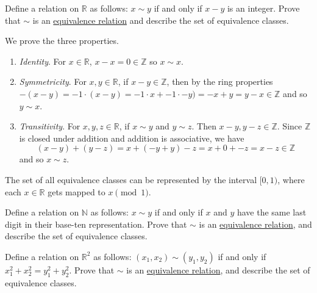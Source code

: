   \begin{exercise}
    Define a relation on $\mathbb{R}$ as follows: $x \sim y$ if and only if $x - y$ is an integer. Prove that $\sim$ is an \hyperref[def:equivalence_relation]{equivalence relation} and describe the set of equivalence classes.
  \end{exercise}
  \begin{solution}
    We prove the three properties. 
    \begin{enumerate}
      \item \textit{Identity}. For $x \in \mathbb{R}$, $x - x = 0 \in \mathbb{Z}$ so $x \sim x$. 
      \item \textit{Symmetricity}. For $x, y \in \mathbb{R}$, if $x - y \in \mathbb{Z}$, then by the ring properties $-(x - y) = -1 \cdot (x - y) = -1 \cdot x + -1 \cdot -y) = -x + y = y - x \in \mathbb{Z}$ and so $y \sim x$. 
      \item \textit{Transitivity}. For $x, y, z \in \mathbb{R}$, if $x \sim y$ and $y \sim z$. Then $x - y, y - z \in \mathbb{Z}$. Since $\mathbb{Z}$ is closed under addition and addition is associative, we have 
        \begin{equation}
          (x - y) + (y - z) = x + (-y + y) - z = x + 0 + -z = x - z \in \mathbb{Z}
        \end{equation}
        and so $x \sim z$. 
    \end{enumerate}
    The set of all equivalence classes can be represented by the interval $[0, 1)$, where each $x \in \mathbb{R}$ gets mapped to $x \pmod{1}$. 
  \end{solution}

  \begin{exercise}
    Define a relation on $\mathbb{N}$ as follows: $x \sim y$ if and only if $x$ and $y$ have the same last digit in their base-ten representation. Prove that $\sim$ is an \hyperref[def:equivalence_relation]{equivalence relation}, and describe the set of equivalence classes.
  \end{exercise}

  \begin{exercise}
    Define a relation on $\mathbb{R}^2$ as follows: $(x_1, x_2) \sim (y_1, y_2)$ if and only if $x_1^2 + x_2^2 = y_1^2 + y_2^2$. Prove that $\sim$ is an \hyperref[def:equivalence_relation]{equivalence relation}, and describe the set of equivalence classes.
  \end{exercise}

